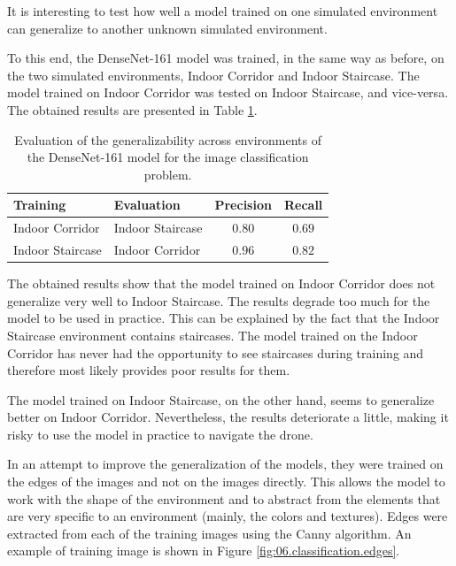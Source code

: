 It is interesting to test how well a model trained on one simulated environment can generalize to another unknown simulated environment.

To this end, the DenseNet-161 model was trained, in the same way as before, on the two simulated environments, Indoor Corridor and Indoor Staircase. The model trained on Indoor Corridor was tested on Indoor Staircase, and vice-versa. The obtained results are presented in Table \ref{tab:06.classification.evaluation.generalisation}.

\begin{table}[H]
    \centering
    \begin{tabular}{|l|l|c|c|}
        \hline
        \textbf{Training} & \textbf{Evaluation} & \textbf{Precision} & \textbf{Recall} \\ \hline
        \hline
        Indoor Corridor & Indoor Staircase & $\num{0.80}$ & $\num{0.69}$ \\ \hline
        Indoor Staircase & Indoor Corridor & $\num{0.96}$ & $\num{0.82}$ \\ \hline
    \end{tabular}
    \caption{Evaluation of the generalizability across environments of the DenseNet-161 model for the image classification problem.}
    \label{tab:06.classification.evaluation.generalisation}
\end{table}

The obtained results show that the model trained on Indoor Corridor does not generalize very well to Indoor Staircase. The results degrade too much for the model to be used in practice. This can be explained by the fact that the Indoor Staircase environment contains staircases. The model trained on the Indoor Corridor has never had the opportunity to see staircases during training and therefore most likely provides poor results for them.

The model trained on Indoor Staircase, on the other hand, seems to generalize better on Indoor Corridor. Nevertheless, the results deteriorate a little, making it risky to use the model in practice to navigate the drone.

In an attempt to improve the generalization of the models, they were trained on the edges of the images and not on the images directly. This allows the model to work with the shape of the environment and to abstract from the elements that are very specific to an environment (mainly, the colors and textures). Edges were extracted from each of the training images using the Canny algorithm. An example of training image is shown in Figure \ref{fig:06.classification.edges}.

